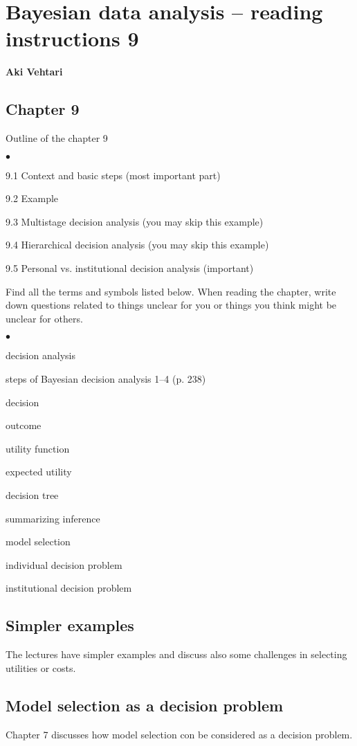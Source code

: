 \documentclass[a4paper,11pt,english]{article}
\begin{document}
\thispagestyle{empty}

\section*{Bayesian data analysis -- reading instructions 9} 
\smallskip
{\bf Aki Vehtari}
\smallskip

\subsection*{Chapter 9}

Outline of the chapter 9
\begin{list}{$\bullet$}{\parsep=0pt\itemsep=2pt}
\item 9.1 Context and basic steps (most important part)
\item 9.2 Example
\item 9.3 Multistage decision analysis (you may skip this example)
\item 9.4 Hierarchical decision analysis (you may skip this example)
\item 9.5 Personal vs. institutional decision analysis (important)
\end{list}

Find all the terms and symbols listed below. When reading the chapter,
write down questions related to things unclear for you or things you
think might be unclear for others. 
\begin{list}{$\bullet$}{\parsep=0pt\itemsep=2pt}
\item decision analysis
\item steps of Bayesian decision analysis 1--4 (p. 238)
\item decision
\item outcome
\item utility function
\item expected utility
\item decision tree
\item summarizing inference
\item model selection
\item individual decision problem
\item institutional decision problem
\end{list}

\subsection*{Simpler examples}

The lectures have simpler examples and discuss also some challenges in
selecting utilities or costs.

\subsection*{Model selection as a decision problem}

Chapter 7 discusses how model selection con be considered as a
decision problem.
\end{document}
